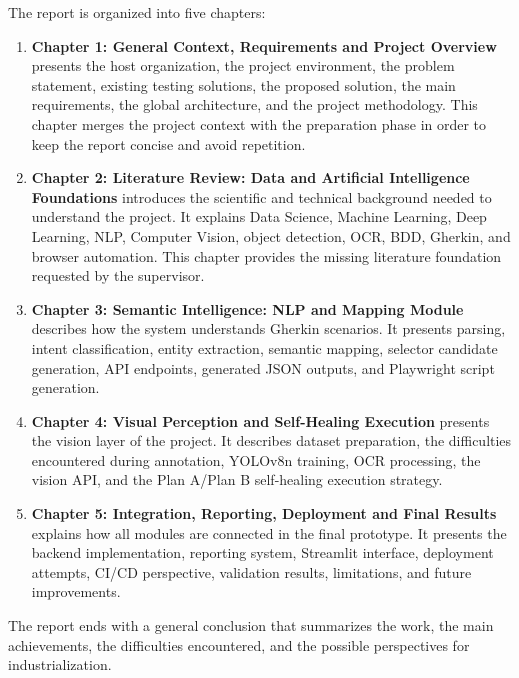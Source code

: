 The report is organized into five chapters:

\begin{enumerate}
	\item \textbf{Chapter 1: General Context, Requirements and Project Overview} presents the host organization, the project environment, the problem statement, existing testing solutions, the proposed solution, the main requirements, the global architecture, and the project methodology. This chapter merges the project context with the preparation phase in order to keep the report concise and avoid repetition.
	
	\item \textbf{Chapter 2: Literature Review: Data and Artificial Intelligence Foundations} introduces the scientific and technical background needed to understand the project. It explains Data Science, Machine Learning, Deep Learning, NLP, Computer Vision, object detection, OCR, BDD, Gherkin, and browser automation. This chapter provides the missing literature foundation requested by the supervisor.
	
	\item \textbf{Chapter 3: Semantic Intelligence: NLP and Mapping Module} describes how the system understands Gherkin scenarios. It presents parsing, intent classification, entity extraction, semantic mapping, selector candidate generation, API endpoints, generated JSON outputs, and Playwright script generation.
	
	\item \textbf{Chapter 4: Visual Perception and Self-Healing Execution} presents the vision layer of the project. It describes dataset preparation, the difficulties encountered during annotation, YOLOv8n training, OCR processing, the vision API, and the Plan A/Plan B self-healing execution strategy.
	
	\item \textbf{Chapter 5: Integration, Reporting, Deployment and Final Results} explains how all modules are connected in the final prototype. It presents the backend implementation, reporting system, Streamlit interface, deployment attempts, CI/CD perspective, validation results, limitations, and future improvements.
\end{enumerate}

The report ends with a general conclusion that summarizes the work, the main achievements, the difficulties encountered, and the possible perspectives for industrialization.
